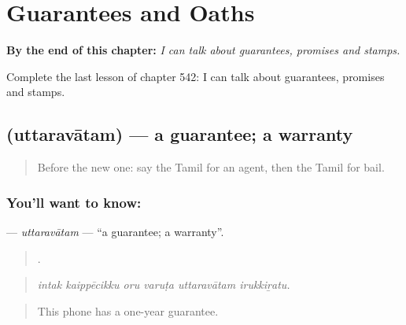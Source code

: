 
\chapter{Guarantees and Oaths}
\label{ch:ta-guarantees-and-oaths}

\begin{chapteropening}
\textbf{By the end of this chapter:} \emph{I can talk about guarantees, promises and stamps.}

Complete the last lesson of chapter 542: I can talk about guarantees, promises and stamps.
\end{chapteropening}

\section[\texorpdfstring{\ta{உத்தரவாதம்} (uttaravātam)}{உத்தரவாதம் (uttaravātam)}]{ (uttaravātam) — a guarantee; a warranty}

\label{lesson:TA-C542-uttaravatam}



\begin{quote}
Before the new one: say the Tamil for an agent, then the Tamil for bail.
\end{quote}

\subsection*{You'll want to know: }
\textbf{} — \emph{uttaravātam} — \textquotedblleft{}a guarantee; a warranty\textquotedblright{}.

\begin{quote}
     .
\end{quote}

\begin{quote}
\emph{intak kaippēcikku oru varuṭa uttaravātam irukkiṟatu.}
\end{quote}

\begin{quote}
This phone has a one-year guarantee.
\end{quote}

